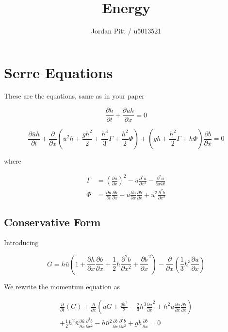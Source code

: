 \documentclass[12pt]{article}
\begin{document}
\title{Energy}
\author{Jordan Pitt / u5013521}

\section{Serre Equations}
These are the equations, same as in your paper

\begin{equation}
\label{eqnSerreconmass}
 \frac{\partial h}{\partial t} + \frac{\partial \bar{u} h}{\partial x}  = 0
\end{equation}



\begin{equation}
\label{eqnSerremomcomp}
\frac{\partial\bar{u} h }{\partial t} + \frac{\partial}{\partial x} \left(\bar{u}^2 h + \frac{gh^2}{2} + \frac{h^3}{3}  \Gamma + \frac{h^2}{2}\Phi \right)   + \left(gh + \frac{h^2}{2}\Gamma + h \Phi \right) \frac{\partial b}{\partial x} = 0
\end{equation}

where

\begin{align*}
\Gamma &= \left(\frac{\partial \bar{u}}{\partial x} \right)^2 - \bar{u}\frac{\partial^2 \bar{u}}{\partial x^2} - \frac{\partial^2 \bar{u}}{\partial x \partial t} \\
\Phi &= \frac{\partial \bar{u}}{\partial t} \frac{\partial b}{\partial x} + \bar{u}\frac{\partial \bar{u}}{\partial x}\frac{\partial b}{\partial x} + \bar{u}^2\frac{\partial^2 b}{\partial x^2}
\end{align*}

\subsection{Conservative Form}

Introducing

\[ G =  h \bar{u} \left(1 + \frac{\partial h}{\partial x}\frac{\partial b}{\partial x} + \frac{1}{2}h\frac{\partial^2 b}{\partial x^2} + \frac{\partial b}{\partial x}^2 \right) - \frac{\partial}{\partial x}\left(\frac{1}{3}h^3  \frac{\partial \bar{u}}{\partial x}\right)\]

We rewrite the momentum equation as

\begin{multline}
\label{eqnSerreconsconmom}
\frac{\partial}{\partial t} \left( G \right)  + \frac{\partial}{\partial x} \left( \bar{u} G + \frac{gh^2}{2} - \frac{2}{3}h^3 \frac{\partial \bar{u}}{\partial x}^2 + h^2 \bar{u}\frac{\partial \bar{u}}{\partial x}\frac{\partial b}{\partial x} \right) \\ + \frac{1}{2}h^2 \bar{u} \frac{\partial \bar{u}}{\partial x} \frac{\partial^2 b}{\partial x^2}  - h \bar{u}^2\frac{\partial b}{\partial x}\frac{\partial^2 b}{\partial x^2} + gh\frac{\partial b}{\partial x} = 0
\end{multline}
\end{document}
